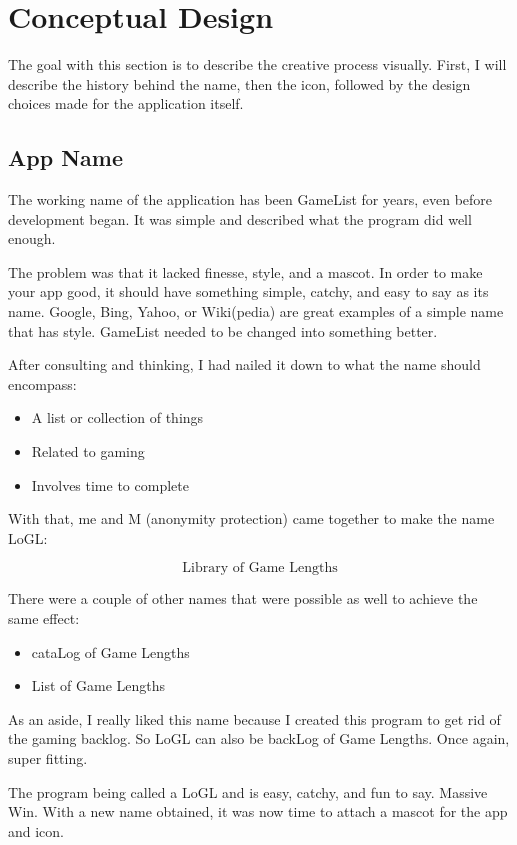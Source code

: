 \section{Conceptual Design}

The goal with this section is to describe the creative process
visually. First, I will describe the history behind the name, then
the icon, followed by the design choices made for the application itself.

\subsection{App Name}

The working name of the application has been GameList for years, even
before development began. It was simple and described what the
program did well enough.

The problem was that it lacked finesse, style, and a mascot. In order
to make your app good, it should have something simple, catchy, and
easy to say as its name. Google, Bing, Yahoo, or Wiki(pedia) are
great examples of a simple name that has style. GameList needed
to be changed into something better.

After consulting and thinking, I had nailed it down to what the name
should encompass:
\begin{itemize}
	\item A list or collection of things
	\item Related to gaming
	\item Involves time to complete
\end{itemize}

With that, me and M (anonymity protection) came together to make the name LoGL:

\[
	\text{Library of Game Lengths}
\]

There were a couple of other names that were possible as well to
achieve the same effect:
\begin{itemize}
	\item cataLog of Game Lengths
	\item List of Game Lengths
\end{itemize}

As an aside, I really liked this name because I created this program
to get rid of the gaming backlog. So LoGL can also be backLog of Game
Lengths. Once again, super fitting.

The program being called a LoGL and is easy, catchy, and fun to say.
Massive Win. With a new name obtained, it was now time to attach a
mascot for the app and icon.

